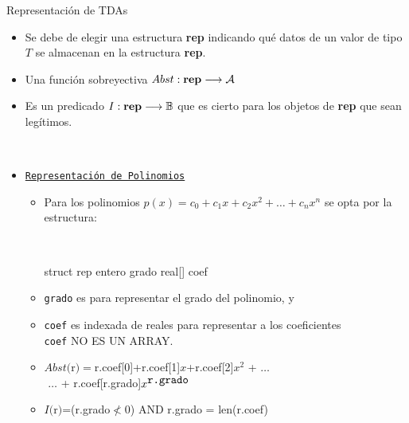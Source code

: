 \documentclass[10pt,envcountsect,spanish]{beamer}
\begin{document}
\begin{frame}[fragile]{Representación de TDAs}

\begin{itemize}
\item Se debe de elegir una estructura \textbf{rep} indicando qué datos de un valor de tipo $T$ se almacenan en la estructura \textbf{rep}.

 
\item {} Una función sobreyectiva $Abst: \mbox{\textbf{rep}} \longrightarrow {\cal A}$ 

\item {} Es un predicado
$I: \mbox{\textbf{rep}} \longrightarrow \mathbb{B}$ que es cierto para los objetos de \textbf{rep} que sean legítimos.


\

\item \unEjemplo \texttt{\underline{Representación de Polinomios}}
\begin{itemize}[nosep]
\item	 Para los polinomios {\small $p(x)=c_0+c_1x+c_2x^2+\ldots+c_nx^n$ }se opta por la estructura:

\hfil \begin{minipage}{.24\textwidth}
\scriptsize \tt
\begin{pyverbatim}[][frame=single]
struct rep {
   entero grado
   real[] coef
}
\end{pyverbatim}
\end{minipage}




\item \texttt{grado} es  para representar el grado del polinomio, y 
\item \texttt{coef} es  indexada de reales para representar a los coeficientes \\
\texttt{coef} NO ES UN ARRAY.
\item {\ttfamily  \footnotesize
$Abst($r$)=$r.coef[0]+r.coef[1]$x$+r.coef[2]$x^2$ + $\ldots$  \\
$ $ \hfill $\ldots$ + r.coef[r.grado]$x^{\mbox{\texttt{r.grado}}} $
}

\item {\ttfamily 
$I($r$)$=(r.grado$\not<$0) AND r.grado = len(r.coef)
}
\end{itemize}

\end{itemize}

\end{frame}
\end{document}

